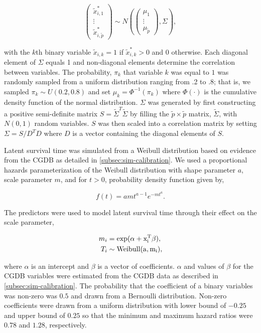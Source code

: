 \documentclass[11pt,final,fleqn]{article}\usepackage[]{graphicx}\usepackage[]{color}
\theoremstyle{plain}
\begin{document}
\begin{equation}
\begin{pmatrix}
\tilde{x}_{i,1}^{*} \\
\vdots \\
\tilde{x}_{i,\tilde{p}}^{*}
\end{pmatrix}
\sim
N
\left(\begin{pmatrix}
\mu_{1} \\
\vdots \\
\mu_{\tilde{p}}
\end{pmatrix},
\Sigma
\right),
\end{equation}

with the $k$th binary variable $\tilde{x}_{i,k}=1$ if $\tilde{x}_{i,k}^{*} > 0$ and $0$ otherwise. Each diagonal element of $\Sigma$ equals 1 and non-diagonal elements determine the correlation between variables. The probability, $\pi_k$ that  variable $k$ was equal to $1$ was randomly sampled from a uniform distribution ranging from .2 to .8; that is, we sampled $\pi_k \sim U(0.2, 0.8)$ and set $\mu_k = \Phi^{-1}(\pi_k)$ where $\Phi(\cdot)$ is the cumulative density function of the normal distribution. $\Sigma$ was generated by first constructing a positive semi-definite matrix $S = \tilde{\Sigma}^T\tilde{\Sigma}$ by filling the $\tilde{p} \times \tilde{p}$ matrix, $\tilde{\Sigma}$, with $N(0,1)$ random variables. $S$ was then scaled into a correlation matrix by setting $\Sigma = S/D^TD$ where $D$ is a vector containing the diagonal elements of $S$. 

Latent survival time was simulated from a  Weibull distribution based on evidence from the CGDB as detailed in \autoref{subsec:sim-calibration}. We used a proportional hazards parameterization of the Weibull distribution with shape parameter $a$, scale parameter $m$, and for $t> 0$, probability density function given by,

\begin{equation}
f(t) = amt^{a-1}e^{-mt^a}.
\end{equation}

The predictors were used to model latent survival time through their effect on the scale parameter,

\begin{align} 
m_i &= \rm{exp}(\alpha + x_i^T\beta), \\
T_i &\sim \rm{Weibull}(a, m_i),
\end{align} 

where $\alpha$ is an intercept and $\beta$ is a vector of coefficients. $\alpha$ and values of $\beta$ for the CGDB variables were estimated from the CGDB data as described in \autoref{subsec:sim-calibration}. The probability that the coefficient of a binary variables was non-zero was $0.5$ and drawn from a Bernoulli distribution. Non-zero coefficients were drawn from a uniform distribution with lower bound of $-0.25$ and upper bound of $0.25$ so that the minimum and maximum hazard ratios were $0.78$ and $1.28$, respectively. 
\end{document}
